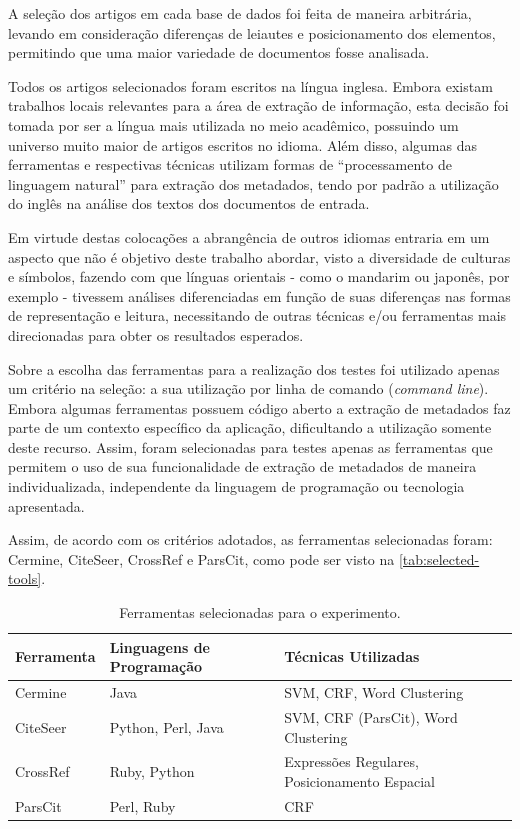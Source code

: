 A seleção dos artigos em cada base de dados foi feita de maneira arbitrária, levando em consideração diferenças de leiautes e posicionamento dos elementos, permitindo que uma maior variedade de documentos fosse analisada.


Todos os artigos selecionados foram escritos na língua inglesa. Embora existam trabalhos locais relevantes para a área de extração de informação, esta decisão foi tomada por ser a língua mais utilizada no meio acadêmico, possuindo um universo muito maior de artigos escritos no idioma. Além disso, algumas das ferramentas e respectivas técnicas utilizam formas de ``processamento de linguagem natural'' para extração dos metadados, tendo por padrão a utilização do inglês na análise dos textos dos documentos de entrada.

Em virtude destas colocações a abrangência de outros idiomas entraria em um aspecto que não é objetivo deste trabalho abordar, visto a diversidade de culturas e símbolos, fazendo com que línguas orientais - como o mandarim ou japonês, por exemplo - tivessem análises diferenciadas em função de suas diferenças nas formas de representação e leitura, necessitando de outras técnicas e/ou ferramentas mais direcionadas para obter os resultados esperados.

Sobre a escolha das ferramentas para a realização dos testes foi utilizado apenas um critério na seleção: a sua utilização por linha de comando (\emph{command line}). Embora algumas ferramentas possuem código aberto a extração de metadados faz parte de um contexto específico da aplicação, dificultando a utilização somente deste recurso. Assim, foram selecionadas para testes apenas as ferramentas que permitem o uso de sua funcionalidade de extração de metadados de maneira individualizada, independente da linguagem de programação ou tecnologia apresentada. 

Assim, de acordo com os critérios adotados, as ferramentas selecionadas foram: Cermine, CiteSeer, CrossRef e ParsCit, como pode ser visto na \autoref{tab:selected-tools}.

\begin{table}[h!]
    \caption{Ferramentas selecionadas para o experimento.}
    \begin{center}
        \begin{tabular}{|C{3cm}|C{4cm}|C{6cm}|}
            \hline 
            \textbf{Ferramenta} & \textbf{Linguagens de Programação} & \textbf{Técnicas Utilizadas} \\ 
            \hline 
            Cermine & Java & SVM, CRF, Word Clustering \\ \hline
            CiteSeer & Python, Perl, Java & SVM, CRF (ParsCit), Word Clustering \\ \hline
            CrossRef & Ruby, Python & Expressões Regulares, Posicionamento Espacial \\ \hline
            ParsCit & Perl, Ruby & CRF \\ \hline
        \end{tabular}
    \end{center}
    \label{tab:selected-tools}
\end{table}
    
